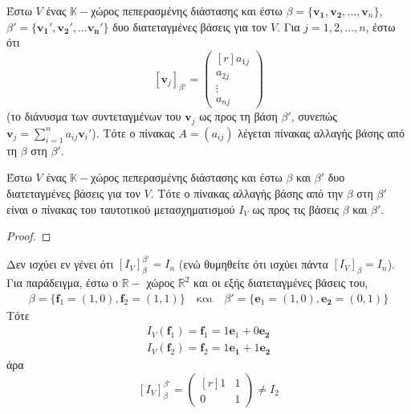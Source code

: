 \begin{dfn}
  Έστω $V$ ένας $ \mathbb{K}- $χώρος πεπερασμένης διάστασης και έστω $ \beta = 
  \{ \mathbf{v_{1}}, \mathbf{v_{2}}, \ldots, \mathbf{v}_{n} \}$,
  $ \beta ' = \{ \mathbf{v_{1}}', \mathbf{v_{2}}', \ldots \mathbf{v_{n}}' \} $ 
  δυο διατεταγμένες βάσεις για τον $V$. Για $ j = 1,2, \ldots , n $, έστω ότι 
  \[
    [\mathbf{v}_{j}]_{\beta '} = 
    \begin{pmatrix*}[r] a_{1j} \\ a_{2j} \\ \vdots \\ a_{nj} \end{pmatrix*} 
  \] 
  (το διάνυσμα των συντεταγμένων του $ \mathbf{v}_{j} $ ως προς τη βάση $ \beta ' $, 
  συνεπώς $ \mathbf{v}_{j} = \sum_{i=1}^{n} a_{ij} \mathbf{v}_{i}' $). Τότε ο 
  πίνακας $ A = (a _{ij}) $ λέγεται πίνακας αλλαγής βάσης από τη $ \beta $ στη 
  $ \beta ' $.
\end{dfn}

\begin{thm}
  Έστω $V$ ένας $ \mathbb{K}- $χώρος πεπερασμένης διάστασης και έστω $\beta$ και 
  $ \beta ' $ δυο διατεταγμένες βάσεις για τον $V$. Τότε ο πίνακας αλλαγής βάσης από 
  την $\beta$ στη $\beta'$ είναι ο πίνακας του ταυτοτικού μετασχηματισμού $ I_{V} $ 
  ως προς τις βάσεις $\beta$ και $ \beta ' $.
\end{thm}

\begin{proof}

\end{proof}

\begin{rem}
  Δεν ισχύει εν γένει ότι $ [I_{V}]_{\beta }^{\beta '} = I_{n} $ (ενώ θυμηθείτε ότι 
  ισχύει πάντα $ [I_{V}]_{\beta } = I_{n} $). Για παράδειγμα, έστω ο $ \mathbb{R}- $ 
  χώρος $ \mathbb{R}^{2} $ και οι εξής διατεταγμένες βάσεις του, 
  \begin{align*}
    \beta = \{ \mathbf{f}_{1} = (1,0), \mathbf{f}_{2} = (1,1) \} \quad \text{και} 
    \quad \beta ' = \{ \mathbf{e}_{1} = (1,0), \mathbf{e_{2}} = (0,1) \} 
  \end{align*}
  Τότε
  \begin{gather*}
    I_{V}(\mathbf{f}_{1}) = \mathbf{f}_{1} = 1 \mathbf{e}_{1} + 0 \mathbf{e_{2}} \\
    I_{V}(\mathbf{f}_{2}) = \mathbf{f}_{2} = 1 \mathbf{e_{1}}+ 1 \mathbf{e_{2}}
  \end{gather*} 
  άρα 
  \[
    [I_{V}]_{\beta }^{\beta '} = 
    \begin{pmatrix*}[r]
      1 & 1 \\
      0 & 1
    \end{pmatrix*} \neq I_{2}
  \] 
\end{rem}


